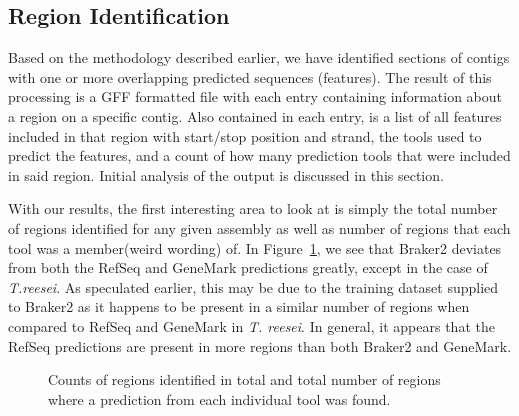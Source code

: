 \subsection{Region Identification}

Based on the methodology described earlier, we have identified
sections of contigs with one or more overlapping predicted sequences
(features). The result of this processing is a GFF formatted file with
each entry containing information about a region on a specific
contig. Also contained in each entry, is a list of all features
included in that region with start/stop position and strand, the tools
used to predict the features, and a count of how many prediction tools
that were included in said region. Initial analysis of the output is
discussed in this section.

With our results, the first interesting area to look at is simply the
total number of regions identified for any given assembly as well as
number of regions that each tool was a member(weird wording) of. In
Figure~\ref{regioncounts}, we see that Braker2 deviates from both the
RefSeq and GeneMark predictions greatly, except in the case of
\textit{T.reesei}. As speculated earlier, this may be due to the
training dataset supplied to Braker2 as it happens to be present in a
similar number of regions when compared to RefSeq and GeneMark in
\textit{T. reesei}. In general, it appears that the RefSeq predictions
are present in more regions than both Braker2 and GeneMark. 

\begin{figure}
  \caption{Counts of regions identified in total and total number of
    regions where a prediction from each individual tool was found.}
  \label{regioncounts}
\end{figure}

